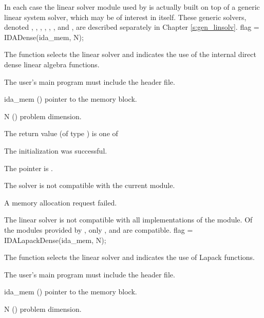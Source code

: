 In each case the linear solver module used by {\ida} is actually built
on top of a generic linear system solver, which may be of interest in
itself.  These generic solvers, denoted {\dense}, {\band}, {\klu},
{\superlumt}, {\spgmr}, {\spbcg}, and {\sptfqmr}, are 
described separately in Chapter \ref{s:gen_linsolv}.
{
  flag = IDADense(ida\_mem, N);
}
{
  The function  selects the {\idadense} linear solver and indicates
  the use of the internal direct dense linear algebra functions. 

  The user's main program must include the  header file.
}
{
  \begin{args}
  \item[ida\_mem] ()
    pointer to the {\ida} memory block.
  \item[N] ()
    problem dimension.
  \end{args}
}
{
  The return value  (of type ) is one of
  \begin{args}
  \item[\Id{IDADLS\_SUCCESS}] 
    The {\idadense} initialization was successful.
  \item[\Id{IDADLS\_MEM\_NULL}]
    The  pointer is .
  \item[\Id{IDADLS\_ILL\_INPUT}]
    The {\idadense} solver is not compatible with the current {\nvector} module.
  \item[\Id{IDADLS\_MEM\_FAIL}]
    A memory allocation request failed.
  \end{args}
}
{
  The {\idadense} linear solver is not compatible with all
  implementations of the {\nvector} module.  Of the {\nvector} modules
  provided by {\sundials}, only {\nvecs}, {\nvecopenmp} and
  {\nvecpthreads} are compatible.
}
{
  flag = IDALapackDense(ida\_mem, N);
}
{
  The function  selects the {\idadense} linear solver and 
  indicates the use of Lapack functions. 

  The user's main program must include the  header file.
}
{
  \begin{args}
  \item[ida\_mem] ()
    pointer to the {\ida} memory block.
  \item[N] ()
    problem dimension.
  \end{args}
}
